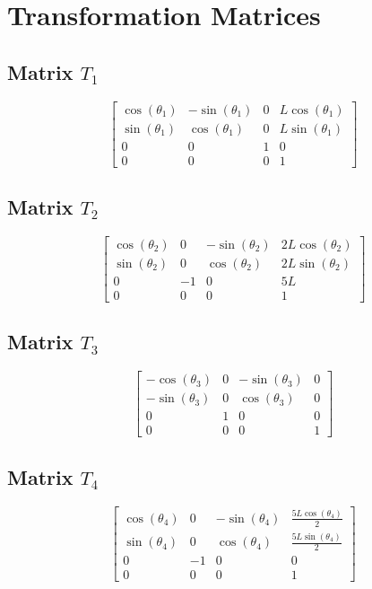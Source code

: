 \section{Transformation Matrices}
\subsection*{Matrix $T_{1}$}
\[ \left[\begin{matrix}\cos{\left(\theta_{1} \right)} & - \sin{\left(\theta_{1} \right)} & 0 & L \cos{\left(\theta_{1} \right)}\\\sin{\left(\theta_{1} \right)} & \cos{\left(\theta_{1} \right)} & 0 & L \sin{\left(\theta_{1} \right)}\\0 & 0 & 1 & 0\\0 & 0 & 0 & 1\end{matrix}\right] \]
\subsection*{Matrix $T_{2}$}
\[ \left[\begin{matrix}\cos{\left(\theta_{2} \right)} & 0 & - \sin{\left(\theta_{2} \right)} & 2 L \cos{\left(\theta_{2} \right)}\\\sin{\left(\theta_{2} \right)} & 0 & \cos{\left(\theta_{2} \right)} & 2 L \sin{\left(\theta_{2} \right)}\\0 & -1 & 0 & 5 L\\0 & 0 & 0 & 1\end{matrix}\right] \]
\subsection*{Matrix $T_{3}$}
\[ \left[\begin{matrix}- \cos{\left(\theta_{3} \right)} & 0 & - \sin{\left(\theta_{3} \right)} & 0\\- \sin{\left(\theta_{3} \right)} & 0 & \cos{\left(\theta_{3} \right)} & 0\\0 & 1 & 0 & 0\\0 & 0 & 0 & 1\end{matrix}\right] \]
\subsection*{Matrix $T_{4}$}
\[ \left[\begin{matrix}\cos{\left(\theta_{4} \right)} & 0 & - \sin{\left(\theta_{4} \right)} & \frac{5 L \cos{\left(\theta_{4} \right)}}{2}\\\sin{\left(\theta_{4} \right)} & 0 & \cos{\left(\theta_{4} \right)} & \frac{5 L \sin{\left(\theta_{4} \right)}}{2}\\0 & -1 & 0 & 0\\0 & 0 & 0 & 1\end{matrix}\right] \]
